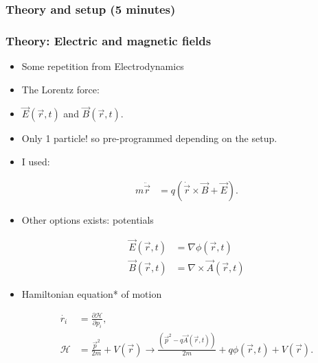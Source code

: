 \documentclass{beamer}
\begin{document}
\begin{frame}
\frametitle{Theory and setup (5 minutes)}
\tableofcontents[currentsection]
\end{frame}



\begin{frame}
\frametitle{Theory: Electric and magnetic fields}
\begin{itemize}
\item<1-> Some repetition from Electrodynamics
\item<2-> The Lorentz force:


\item<3-> $\vec{E}(\vec{r},t)$ and $\vec{B}(\vec{r},t)$.

\item<4-> Only 1 particle! so pre-programmed depending on the setup.
\end{itemize}
\end{frame}

\begin{frame}
\begin{itemize}
\frametitle{Theory: Alternative approach}

\item<1-> I used:

\begin{align*}
m \ddot{\vec{r}} &= q ( \dot{\vec{r}}\times \vec{B}+\vec{E}).
\end{align*}

\item<2-> Other options exists: potentials

\begin{align*}
\vec{E}(\vec{r},t) &= \nabla \phi(\vec{r},t)\\
\vec{B}(\vec{r},t) &= \nabla \times \vec{A}(\vec{r},t)
\end{align*}

\item<3-> Hamiltonian equation* of motion

\begin{align*}
\dot{r_i} &= \frac{\partial \mathcal{H}}{\partial p_i},\\
\mathcal{H} &= \frac{\vec{p}^2}{2m}+V(\vec{r}) \rightarrow \frac{(\vec{p}^2-q\vec{A}(\vec{r},t))}{2m}+q\phi(\vec{r},t)+V(\vec{r}).
\end{align*}

\end{itemize}
\end{frame}
\end{document}
